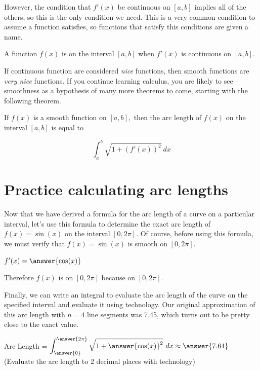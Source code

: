 \documentclass[handout,nooutcomes]{ximera}
\begin{document}
However, the condition that $f'(x)$ be continuous on $[a,b]$ implies all of the others, so this is the only condition we need.  This is a very common condition to assume a function satisfies, so functions that satisfy this conditions are given a name.  

\begin{definition}
A function $f(x)$ is  on the interval $[a,b]$ when $f'(x)$ is continuous on $[a,b].$
\end{definition}

If continuous function are considered \textit{nice} functions, then smooth functions are \textit{very nice} functions.  If you continue learning calculus, you are likely to see smoothness as a hypothesis of many more theorems to come, starting with the following theorem. 

\begin{theorem}
If $f(x)$ is a smooth function on $[a,b],$ then the arc length of $f(x)$ on the interval $[a,b]$ is equal to 

$$\displaystyle\int_{a}^{b} \sqrt{1+(f'(x))^2} \ dx$$

\end{theorem}

\section{Practice calculating arc lengths}


Now that we have derived a formula for the arc length of a curve on a particular interval, let's use this formula to determine the exact arc length of $f(x)=\sin(x)$ on the interval $[0,2\pi]$.  Of course, before using this formula, we must verify that $f(x)=\sin(x)$ is smooth on $[0,2\pi]$.

\begin{problem}

$f'(x) = \answer{\cos(x)}$

\begin{problem}

Therefore $f(x)$ is  on $[0,2\pi]$ because  on $[0,2\pi]$.  

\begin{problem}

Finally, we can write an integral to evaluate the arc length of the curve on the specified interval and evaluate it using technology.  Our original approximation of this arc length with $n=4$ line segments was 7.45, which turns out to be pretty close to the exact value.  

Arc Length = $\displaystyle\int_{\answer{0}}^{\answer{2\pi}} \sqrt{1+{\answer{\cos(x)}^2}} \ dx \approx \answer{7.64}$ (Evaluate the arc length to 2 decimal places with technology)


\end{problem}
\end{problem}
\end{problem}
\end{document}
